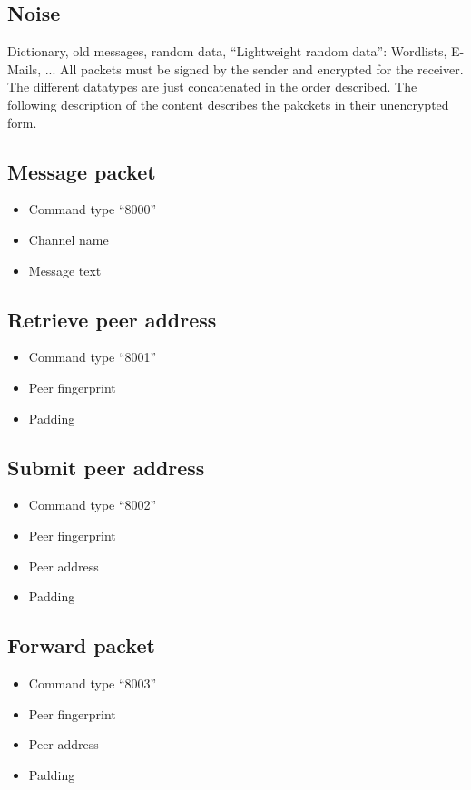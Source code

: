 \documentclass[12pt,a4paper]{book}
\begin{document}
\subsection{Noise}
Dictionary, old messages, random data,
"`Lightweight random data"': Wordlists, E-Mails, ...
All packets must be signed by the sender and encrypted for the receiver.
The different datatypes are just concatenated in the order described.
The following description of the content describes the pakckets
in their unencrypted form.
\subsection{Message packet}
\begin{itemize}
\item Command type "`8000"'
\item Channel name
\item Message text
\end{itemize}
\subsection{Retrieve peer address}
\begin{itemize}
\item Command type "`8001"'
\item Peer fingerprint
\item Padding
\end{itemize}
\subsection{Submit peer address}
\begin{itemize}
\item Command type "`8002"'
\item Peer fingerprint
\item Peer address
\item Padding
\end{itemize}
\subsection{Forward packet}
\begin{itemize}
\item Command type "`8003"'
\item Peer fingerprint
\item Peer address
\item Padding
\end{itemize}
\end{document}
